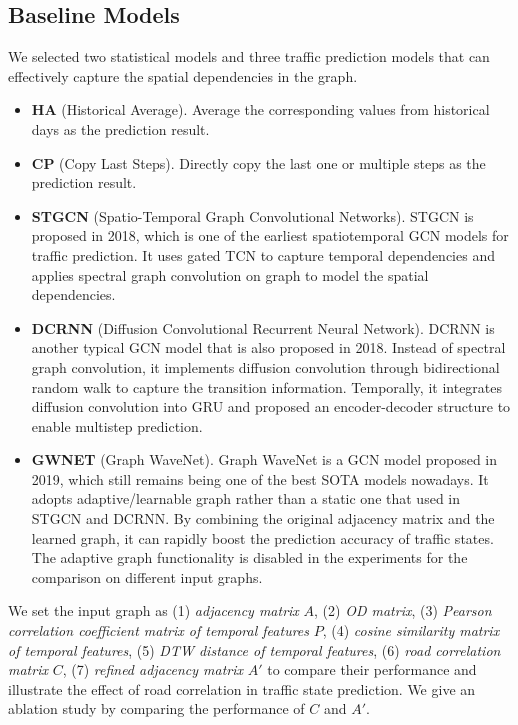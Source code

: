 \subsection{Baseline Models}
We selected two statistical models and three traffic prediction models that can effectively capture the spatial dependencies in the graph.

\begin{itemize}
    \item \textbf{HA} (Historical Average). Average the corresponding values from historical days as the prediction result.
    \item \textbf{CP} (Copy Last Steps). Directly copy the last one or multiple steps as the prediction result.
    \item \textbf{STGCN}\cite{STGCN} (Spatio-Temporal Graph Convolutional Networks). STGCN is proposed in 2018, which is one of the earliest spatiotemporal GCN models for traffic prediction. It uses gated TCN\cite{TCN} to capture temporal dependencies and applies spectral graph convolution\cite{GCN0} on graph to model the spatial dependencies.
    \item \textbf{DCRNN}\cite{DCRNN} (Diffusion Convolutional Recurrent Neural Network). DCRNN is another typical GCN model that is also proposed in 2018. Instead of spectral graph convolution, it implements diffusion convolution through bidirectional random walk to capture the transition information. Temporally, it integrates diffusion convolution into GRU and proposed an encoder-decoder structure to enable multistep prediction.
    \item \textbf{GWNET}\cite{GWNET} (Graph WaveNet). Graph WaveNet is a GCN model proposed in 2019, which still remains being one of the best SOTA models nowadays. It adopts adaptive/learnable graph rather than a static one that used in STGCN and DCRNN. By combining the original adjacency matrix and the learned graph, it can rapidly boost the prediction accuracy of traffic states. The adaptive graph functionality is disabled in the experiments for the comparison on different input graphs.
\end{itemize}

We set the input graph as (1) \textit{adjacency matrix} $A$, (2) \textit{OD matrix}, (3) \textit{Pearson correlation coefficient matrix of temporal features} $P$, (4) \textit{cosine similarity matrix of temporal features}, (5) \textit{DTW distance of temporal features}, (6) \textit{road correlation matrix} $C$, (7) \textit{refined adjacency matrix} $A'$ to compare their performance and illustrate the effect of road correlation in traffic state prediction. We give an ablation study by comparing the performance of $C$ and $A'$.

